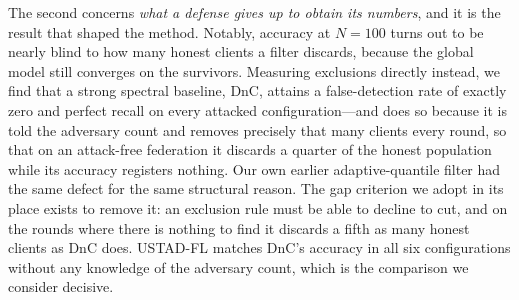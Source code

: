 \documentclass[journal]{IEEEtran}
\begin{document}
The second concerns \emph{what a defense gives up to obtain its numbers}, and it is the result that shaped the method. Notably, accuracy at $N=100$ turns out to be nearly blind to how many honest clients a filter discards, because the global model still converges on the survivors. Measuring exclusions directly instead, we find that a strong spectral baseline, DnC, attains a false-detection rate of exactly zero and perfect recall on every attacked configuration---and does so because it is told the adversary count and removes precisely that many clients every round, so that on an attack-free federation it discards a quarter of the honest population while its accuracy registers nothing. Our own earlier adaptive-quantile filter had the same defect for the same structural reason. The gap criterion we adopt in its place exists to remove it: an exclusion rule must be able to decline to cut, and on the rounds where there is nothing to find it discards a fifth as many honest clients as DnC does. USTAD-FL matches DnC's accuracy in all six configurations without any knowledge of the adversary count, which is the comparison we consider decisive.
\end{document}
